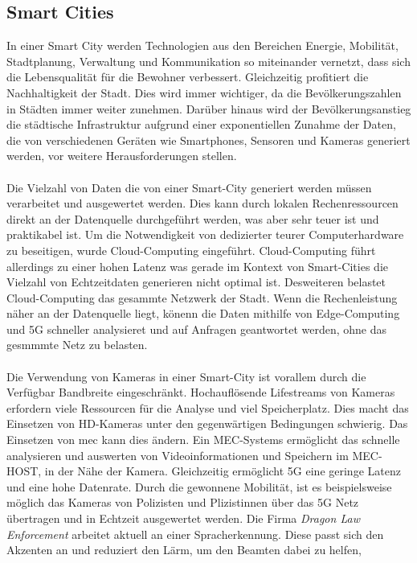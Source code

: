 \documentclass[runningheads]{llncs}
\numberwithin{figure}{section}
\begin{document}
\subsection{Smart Cities}
\label{subsec:Smart Cities}
In einer Smart City werden Technologien aus den Bereichen Energie, Mobilität, Stadtplanung, 
Verwaltung und Kommunikation so miteinander vernetzt, dass sich die Lebensqualität für die Bewohner verbessert. 
Gleichzeitig profitiert die Nachhaltigkeit der Stadt. Dies wird immer wichtiger, da die Bevölkerungszahlen in 
Städten immer weiter zunehmen.
Darüber hinaus wird der Bevölkerungsanstieg die städtische Infrastruktur aufgrund einer 
exponentiellen Zunahme der Daten, die von verschiedenen Geräten wie Smartphones, Sensoren und Kameras generiert werden, 
vor weitere Herausforderungen stellen. 
\\
\\
Die Vielzahl von Daten die von einer Smart-City generiert werden müssen verarbeitet und ausgewertet werden. Dies kann durch lokalen Rechenressourcen
direkt an der Datenquelle durchgeführt werden, was aber sehr teuer ist und praktikabel ist. 
Um die Notwendigkeit von dedizierter teurer Computerhardware zu beseitigen, wurde Cloud-Computing eingeführt. Cloud-Computing führt allerdings
zu einer hohen Latenz was gerade im Kontext von Smart-Cities die Vielzahl von Echtzeitdaten generieren nicht optimal ist.
Desweiteren belastet Cloud-Computing das gesammte Netzwerk der Stadt. 
Wenn die Rechenleistung näher an der Datenquelle liegt, könenn die Daten mithilfe von Edge-Computing und 5G schneller analysieret
und auf Anfragen geantwortet werden, ohne das gesmmmte Netz zu belasten.
\\
\\
Die Verwendung von Kameras in einer Smart-City ist vorallem durch die Verfügbar Bandbreite eingeschränkt. 
Hochauflösende Lifestreams von Kameras erfordern viele Ressourcen für die Analyse und viel Speicherplatz. 
Dies macht das Einsetzen von HD-Kameras unter den gegenwärtigen Bedingungen schwierig.
Das Einsetzen von \acrlong{mec} kann dies ändern. Ein MEC-Systems ermöglicht das schnelle analysieren und auswerten von
Videoinformationen und Speichern im MEC-HOST, in der Nähe der Kamera. Gleichzeitig ermöglicht  5G eine geringe Latenz und eine 
hohe Datenrate. Durch die gewonnene Mobilität, ist es beispielsweise möglich das Kameras von Polizisten und Plizistinnen über das 5G Netz
übertragen und in Echtzeit ausgewertet werden. Die Firma \textit{Dragon Law Enforcement} arbeitet aktuell an einer Spracherkennung.
Diese passt sich den Akzenten an und reduziert den Lärm, um den Beamten dabei zu helfen, 
\end{document}
